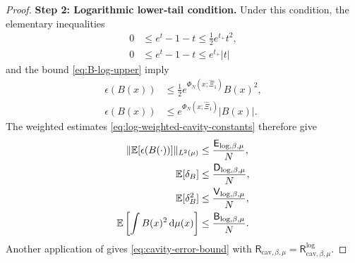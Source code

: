 \documentclass[11pt,reqno]{amsart}
\numberwithin{equation}{section}
\theoremstyle{plain}
\theoremstyle{remark}
\DeclarePairedDelimiter{\norm}{\lVert}{\rVert}
\newcommand{\md}{\mathrm{d}}
\newcommand{\E}{{\mathbb{E}}}
\newcommand{\be}{\beta}
\newcommand{\step}[1]{\par\medskip\noindent\textbf{#1}}
\begin{document}
\begin{proof}
\step{Step 2: Logarithmic lower-tail condition.}
Under this condition, the elementary inequalities
\begin{subequations}\label{eq:log-taylor-bounds}
\begin{align}
 0&\le e^t-1-t\le \frac12 e^{t_+}t^2,\label{eq:log-taylor-quadratic}\\
 0&\le e^t-1-t\le e^{t_+}|t|\label{eq:log-taylor-linear}
\end{align}
\end{subequations}
and the bound \eqref{eq:B-log-upper} imply
\begin{subequations}\label{eq:log-epsilon-bounds}
\begin{align}
 \epsilon(B(x))&\le \frac12 e^{\Phi_N(x;\hat\Xi_1)}B(x)^2,\label{eq:log-epsilon-quadratic}\\
 \epsilon(B(x))&\le e^{\Phi_N(x;\hat\Xi_1)}|B(x)|.\label{eq:log-epsilon-linear}
\end{align}
\end{subequations}
The weighted estimates \eqref{eq:log-weighted-cavity-constants} therefore give
\begin{subequations}\label{eq:log-cavity-abstract-inputs}
\begin{align}
 \norm{\E[\epsilon(B(\cdot))]}_{L^2(\mu)}
 &\le \frac{\mathsf E_{\log,\be,\mu}}{N},\label{eq:log-cavity-E}\\
 \E[\delta_B]
 &\le \frac{\mathsf D_{\log,\be,\mu}}{N},\label{eq:log-cavity-D1}\\
 \E[\delta_B^2]
 &\le \frac{\mathsf V_{\log,\be,\mu}}{N},\label{eq:log-cavity-D2}\\
 \E\left[\int B(x)^2\,\md\mu(x)\right]
 &\le \frac{\mathsf B_{\log,\be,\mu}}{N}.\label{eq:log-cavity-B}
\end{align}
\end{subequations}
Another application of  gives \eqref{eq:cavity-error-bound} with \(\mathsf R_{\mathrm{cav},\be,\mu}=\mathsf R_{\mathrm{cav},\be,\mu}^{\log}\).
\end{proof}
\end{document}
